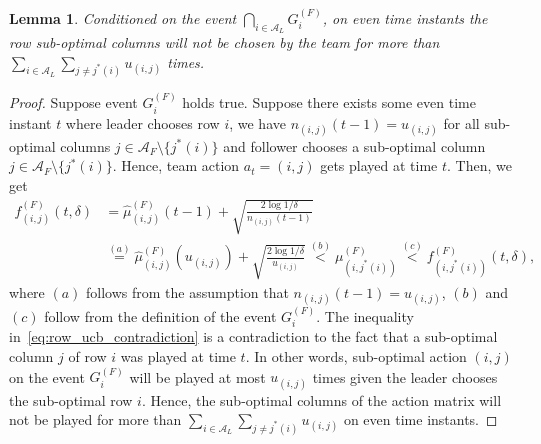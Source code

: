 \documentclass[letterpaper]{article} %
\newtheorem{lemma}{Lemma}
\theoremstyle{definition}
\def\mc{\mathcal}
\begin{document}
\begin{lemma}
\label{lemma:row_ucb}
Conditioned on the event $\bigcap_{i \in \mc{A}_L} G^{(F)}_i$, on even time instants the row sub-optimal columns will not be chosen by the team for more than $\sum_{i \in \mc{A}_L}\sum_{j \neq j^{\ast}(i)}u_{(i,j)}$ times.
\end{lemma}
\begin{proof}
Suppose event $G^{(F)}_{i}$ holds true. Suppose there exists some even time instant $t$ where leader chooses row $i$, we have $n_{(i, j)}(t-1) = u_{(i, j)}$ for all sub-optimal columns $j \in \mc{A}_F\setminus \{j^{\ast}(i)\}$ and follower chooses a sub-optimal column $j \in \mc{A}_F \setminus \{j^{\ast}(i)\}$. Hence, team action $a_{t} = (i, j)$ gets played at time $t$. Then, we get
\begin{align}
    f^{(F)}_{(i, j)}(t, \delta)
    & = \hat{\mu}^{(F)}_{(i, j)}(t-1) + \sqrt{\frac{2\log 1/\delta}{n_{(i, j)}(t-1)}} \\
    & \overset{(a)}= \hat{\mu}^{(F)}_{(i, j)}(u_{(i, j)}) + \sqrt{ \frac{2\log 1/\delta}{u_{(i, j)}}} \overset{(b)} < \mu^{(F)}_{(i,j^{\ast}(i))} \!\overset{(c)} <\! f^{(F)}_{(i,j^{\ast}(i))}(t, \delta),
    \label{eq:row_ucb_contradiction}
\end{align}
where $(a)$ follows from the assumption that $n_{(i, j)}(t-1) = u_{(i, j)}$, $(b)$ and $(c)$ follow from the definition of the event $G^{(F)}_{i}$. The inequality in~\eqref{eq:row_ucb_contradiction} is a contradiction to the fact that a sub-optimal column $j$ of row $i$ was played at time $t$. In other words, sub-optimal action $(i,j)$ on the event $G^{(F)}_i$ will be played at most $u_{(i,j)}$ times given the leader chooses the sub-optimal row $i$. Hence, the sub-optimal columns of the action matrix will not be played for more than $\sum_{i \in \mc{A}_L}\sum_{j \neq j^{\ast}(i)} u_{(i,j)}$ on even time instants. 
\end{proof}
\end{document}
